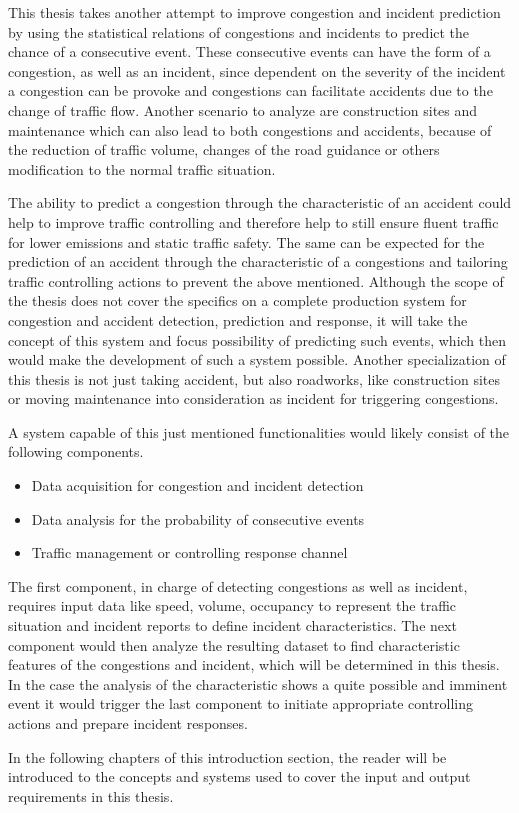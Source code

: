 \documentclass[a4paper,12pt]{report}
\begin{document}
\par This thesis takes another attempt to improve congestion and incident prediction by using the statistical relations of congestions and incidents to predict the chance of a consecutive event. These consecutive events can have the form of a congestion, as well as an incident, since dependent on the severity of the incident a congestion can be provoke and congestions can facilitate accidents due to the change of traffic flow. Another scenario to analyze are construction sites and maintenance which can also lead to both congestions and accidents, because of the reduction of traffic volume, changes of the road guidance or others modification to the normal traffic situation.
\par The ability to predict a congestion through the characteristic of an accident could help to improve traffic controlling and therefore help to still ensure fluent traffic for lower emissions and static traffic safety. The same can be expected for the prediction of an accident through the characteristic of a congestions and tailoring traffic controlling actions to prevent the above mentioned. Although the scope of the thesis does not cover the specifics on a complete production system for congestion and accident detection, prediction and response, it will take the concept of this system and focus possibility of predicting such events, which then would make the development of such a system possible. Another specialization of this thesis is not just taking accident, but also roadworks, like construction sites or moving maintenance into consideration as incident for triggering congestions. 
\par A system capable of this just mentioned functionalities would likely consist of the following components.

\begin{itemize}
  \item Data acquisition for congestion and incident detection
  \item Data analysis for the probability of consecutive events
  \item Traffic management or controlling response channel
\end{itemize}

\par The first component, in charge of detecting congestions as well as incident, requires input data like speed, volume, occupancy to represent the traffic situation and incident reports to define incident characteristics. The next component would then analyze the resulting dataset to find characteristic features of the congestions and incident, which will be determined in this thesis. In the case the analysis of the characteristic shows a quite possible and imminent event it would trigger the last component to initiate appropriate controlling actions and prepare incident responses.
\par In the following chapters of this introduction section, the reader will be introduced to the concepts and systems used to cover the input and output requirements in this thesis.
\end{document}
